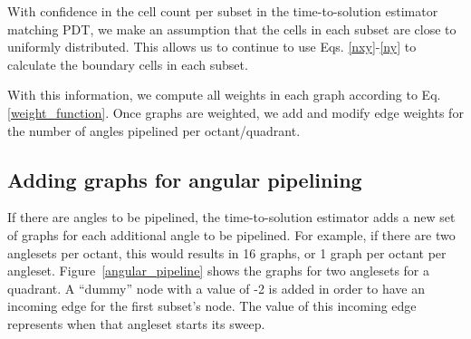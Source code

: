 With confidence in the cell count per subset in the time-to-solution estimator matching PDT, we make an assumption that the cells in each subset are close to uniformly distributed. This allows us to continue to use Eqs. \ref{nxy}-\ref{ny} to calculate the boundary cells in each subset.

With this information, we compute all weights in each graph according to Eq. \ref{weight_function}.
Once graphs are weighted, we add and modify edge weights for the number of angles pipelined per octant/quadrant.

\subsection{Adding graphs for angular pipelining}

If there are angles to be pipelined, the time-to-solution estimator adds a new set of graphs for each additional angle to be pipelined. For example, if there are two anglesets per octant, this would results in 16 graphs, or 1 graph per octant per angleset. Figure~\ref{angular_pipeline} shows the graphs for two anglesets for a quadrant. A ``dummy'' node with a value of -2 is added in order to have an incoming edge for the first subset's node. The value of this incoming edge represents when that angleset starts its sweep.
